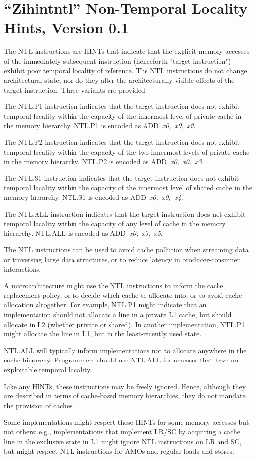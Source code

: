 \chapter{``Zihintntl'' Non-Temporal Locality Hints, Version 0.1}
\label{chap:zihintpause}

The NTL instructions are HINTs that indicate that the explicit memory accesses of the immediately subsequent
instruction (henceforth "target instruction") exhibit poor temporal locality of reference.
The NTL instructions do not change architectural state, nor do they alter the
architecturally visible effects of the target instruction.
Three variants are provided:

The NTL.P1 instruction indicates that the target instruction
does not exhibit temporal locality within the capacity of the innermost level
of private cache in the memory hierarchy.
NTL.P1 is encoded as \mbox{ADD {\em x0, x0, x2}}.

The NTL.P2 instruction indicates that the target instruction
does not exhibit temporal locality within the capacity of the two innermost
levels of private cache in the memory hierarchy.
NTL.P2 is encoded as \mbox{ADD {\em x0, x0, x3}}.

The NTL.S1 instruction indicates that the target instruction
does not exhibit temporal locality within the capacity of the innermost level
of shared cache in the memory hierarchy.
NTL.S1 is encoded as \mbox{ADD {\em x0, x0, x4}}.

The NTL.ALL instruction indicates that the target
instruction does not exhibit temporal locality within the capacity of any
level of cache in the memory hierarchy.
NTL.ALL is encoded as \mbox{ADD {\em x0, x0, x5}}.

\begin{commentary}
The NTL instructions can be used to avoid cache pollution when streaming data
or traversing large data structures, or to reduce latency in producer-consumer
interactions.

A microarchitecture might use the NTL instructions to inform the cache
replacement policy, or to decide which cache to allocate into, or to avoid
cache allocation altogether.
For example, NTL.P1 might indicate that an implementation should not allocate
a line in a private L1 cache, but should allocate in L2 (whether private or
shared).
In another implementation, NTL.P1 might allocate the line in L1, but in
the least-recently used state.

NTL.ALL will typically inform implementations not to allocate anywhere in the
cache hierarchy.
Programmers should use NTL.ALL for accesses that have no exploitable temporal
locality.

Like any HINTs, these instructions may be freely ignored.
Hence, although they are described in terms of cache-based memory hierarchies,
they do not mandate the provision of caches.

Some implementations might respect these HINTs for some memory accesses but
not others: e.g., implementations that implement LR/SC by acquiring a
cache line in the exclusive state in L1 might ignore NTL instructions
on LR and SC, but might respect NTL instructions for
AMOs and regular loads and stores.
\end{commentary}

